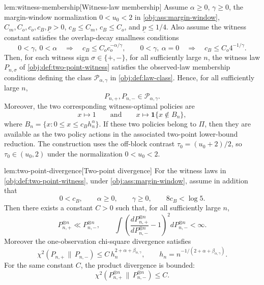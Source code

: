\begin{lemmav}{lem:witness-membership}[Witness-law membership]
Assume \(\alpha\ge0\), \(\gamma\ge0\), the margin-window normalization \(0<u_0<2\) in \cref{obj:ass:margin-window}, \(C_m,C_o,c_o,c_B,\underline p>0\), \(c_B\le C_m\), \(c_B\le C_o\), and \(\underline p\le 1/4\). Also assume the witness constant satisfies the overlap-decay smallness conditions
\[
0<\gamma,\ 0<\alpha
\quad\Longrightarrow\quad
c_B\le C_o c_o^{-\alpha/\gamma},
\qquad
0<\gamma,\ \alpha=0
\quad\Longrightarrow\quad
c_B\le C_o 4^{-1/\gamma}.
\]
Then, for each witness sign \(\sigma\in\{+,-\}\), for all sufficiently large \(n\), the witness law \(P_{n,\sigma}\) of \cref{obj:def:two-point-witness} satisfies the observed-law membership conditions defining the class \(\mathcal P_{\alpha,\gamma}\) in \cref{obj:def:law-class}. Hence, for all sufficiently large \(n\),
\[
P_{n,+},P_{n,-}\in \mathcal P_{\alpha,\gamma}.
\]
Moreover, the two corresponding witness-optimal policies are
\[
x\mapsto 1
\qquad\text{and}\qquad
x\mapsto \mathbf 1\{x\notin B_n\},
\]
where \(B_n=\{x:0\le x\le c_B h_n^\alpha\}\). If these two policies belong to \(\Pi\), then they are available as the two policy actions in the associated two-point lower-bound reduction. The construction uses the off-block contrast \(\tau_0=(u_0+2)/2\), so \(\tau_0\in(u_0,2)\) under the normalization \(0<u_0<2\).
\end{lemmav}

\begin{lemmav}{lem:two-point-divergence}[Two-point divergence]
For the witness laws in \cref{obj:def:two-point-witness}, under \cref{obj:ass:margin-window}, assume in addition that
\[
0<c_B,\qquad \alpha\ge 0,\qquad \gamma\ge 0,
\qquad 8c_B<\log 5.
\]
Then there exists a constant \(C>0\) such that, for all sufficiently large \(n\),
\[
P_{n,+}^{\otimes n}\ll P_{n,-}^{\otimes n},
\qquad
\int \left(\frac{dP_{n,+}^{\otimes n}}{dP_{n,-}^{\otimes n}}-1\right)^2
  dP_{n,-}^{\otimes n}<\infty.
\]
Moreover the one-observation chi-square divergence satisfies
\[
\chi^2(P_{n,+}\,\|\,P_{n,-})
 \le C\,h_n^{2+\alpha+\beta_{\alpha,\gamma}},
\qquad
h_n=n^{-1/(2+\alpha+\beta_{\alpha,\gamma})}.
\]
For the same constant \(C\), the product divergence is bounded:
\[
\chi^2(P_{n,+}^{\otimes n}\,\|\,P_{n,-}^{\otimes n})\le C.
\]
\end{lemmav}

